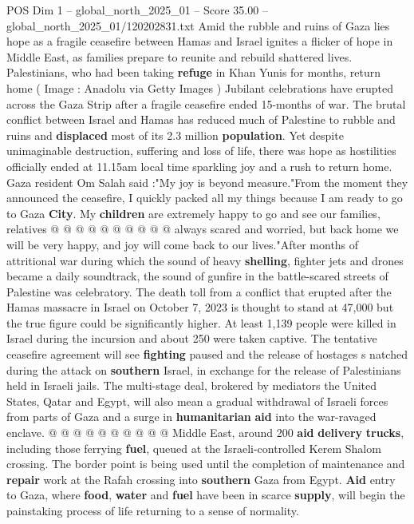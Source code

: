 \begin{textsample}{POS Dim 1 – global\_north\_2025\_01 – Score 35.00 – global\_north\_2025\_01/120202831.txt}  \label{ex:f1_pos_363}
Amid the rubble and ruins of Gaza lies hope as a fragile ceasefire between Hamas and Israel ignites a flicker of hope in Middle East, as families prepare to reunite and rebuild shattered lives.
Palestinians, who had been taking \textbf{refuge} in Khan Yunis for months, return home ( Image : Anadolu via Getty Images ) Jubilant celebrations have erupted across the Gaza Strip after a fragile ceasefire ended 15-months of war.
The brutal conflict between Israel and Hamas has reduced much of Palestine to rubble and ruins and \textbf{displaced} most of its 2.3 million \textbf{population}.
Yet despite unimaginable destruction, suffering and loss of life, there was hope as hostilities officially ended at 11.15am local time sparkling joy and a rush to return home.
Gaza resident Om Salah said :"My joy is beyond measure."From the moment they announced the ceasefire, I quickly packed all my things because I am ready to go to Gaza \textbf{City}.
My \textbf{children} are extremely happy to go and see our families, relatives @ @ @ @ @ @ @ @ @ @ always scared and worried, but back home we will be very happy, and joy will come back to our lives."After months of attritional war during which the sound of heavy \textbf{shelling}, fighter jets and drones became a daily soundtrack, the sound of gunfire in the battle-scared streets of Palestine was celebratory.
The death toll from a conflict that erupted after the Hamas massacre in Israel on October 7, 2023 is thought to stand at 47,000 but the true figure could be significantly higher.
At least 1,139 people were killed in Israel during the incursion and about 250 were taken captive.
The tentative ceasefire agreement will see \textbf{fighting} paused and the release of hostages s natched during the attack on \textbf{southern} Israel, in exchange for the release of Palestinians held in Israeli jails.
The multi-stage deal, brokered by mediators the United States, Qatar and Egypt, will also mean a gradual withdrawal of Israeli forces from parts of Gaza and a surge in \textbf{humanitarian} \textbf{aid} into the war-ravaged enclave. @ @ @ @ @ @ @ @ @ @ Middle East, around 200 \textbf{aid} \textbf{delivery} \textbf{trucks}, including those ferrying \textbf{fuel}, queued at the Israeli-controlled Kerem Shalom crossing.
The border point is being used until the completion of maintenance and \textbf{repair} work at the Rafah crossing into \textbf{southern} Gaza from Egypt. \textbf{Aid} entry to Gaza, where \textbf{food}, \textbf{water} and \textbf{fuel} have been in scarce \textbf{supply}, will begin the painstaking process of life returning to a sense of normality.

\end{textsample}
